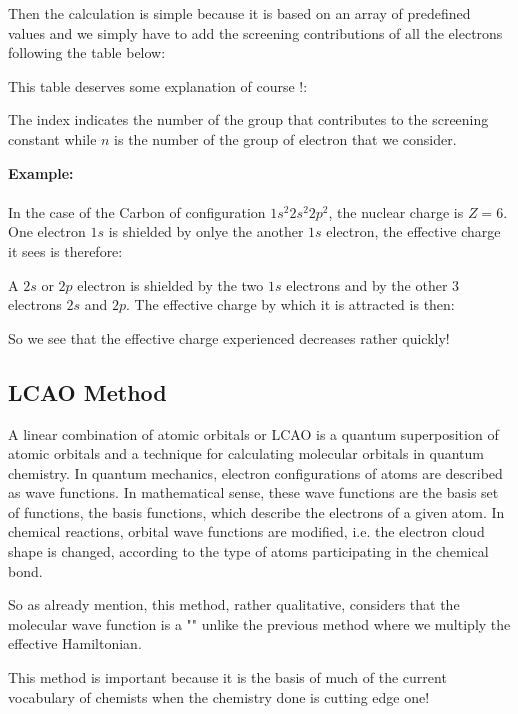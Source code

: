 	Then the calculation is simple because it is based on an array of predefined values and we simply have to add the screening contributions of all the electrons following the table below:
	
	This table deserves some explanation of course !:
	
	The index indicates the number of the group that contributes to the screening constant while $n$ is the number of the group of electron that we consider.
	
	\pagebreak
	\begin{tcolorbox}[colframe=black,colback=white,sharp corners]
	\textbf{{\Large {}}Example:}\\\\
	In the case of the Carbon of configuration $1s^2 2s^2 2p^2$, the nuclear charge is $Z=6$. One electron $1s$ is shielded by onlye the another $1s$ electron, the effective charge it sees is therefore:
	
	A $2s$ or $2p$ electron is shielded by the two $1s$ electrons and by the other $3$ electrons $2s$ and $2p$. The effective charge by which it is attracted is then:
	
	So we see that the effective charge experienced decreases rather quickly!
	\end{tcolorbox}
	
	\subsection{LCAO Method}
	A linear combination of atomic orbitals or LCAO is a quantum superposition of atomic orbitals and a technique for calculating molecular orbitals in quantum chemistry. In quantum mechanics, electron configurations of atoms are described as wave functions. In mathematical sense, these wave functions are the basis set of functions, the basis functions, which describe the electrons of a given atom. In chemical reactions, orbital wave functions are modified, i.e. the electron cloud shape is changed, according to the type of atoms participating in the chemical bond.
	
	So as already mention, this method, rather qualitative, considers that the molecular wave function is a "" unlike the previous method where we multiply the effective Hamiltonian.
	
	This method is important because it is the basis of much of the current vocabulary of chemists when the chemistry done is cutting edge one!
	
